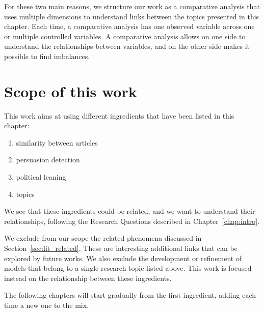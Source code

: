 
For these two main reasons, we structure our work as a comparative analysis that uses multiple dimensions to understand links between the topics presented in this chapter.
Each time, a comparative analysis has one observed variable across one or multiple controlled variables.
A comparative analysis allows on one side to understand the relationships between variables, and on the other side makes it possible to find imbalances.

\section{\statusgreen Scope of this work}
\label{sec:lit_scope}

This work aims at using different ingredients that have been listed in this chapter:
\begin{enumerate}
    \item similarity between articles
    \item persuasion detection
    \item political leaning
    \item topics
\end{enumerate}

We see that these ingredients could be related, and we want to understand their relationships, following the Research Questions described in Chapter~\ref{chap:intro}.

We exclude from our scope the related phenomena discussed in Section~\ref{sec:lit_related}. These are interesting additional links that can be explored by future works.
We also exclude the development or refinement of models that belong to a single research topic listed above. This work is focused instead on the relationship between these ingredients.

The following chapters will start gradually from the first ingredient, adding each time a new one to the mix. 
